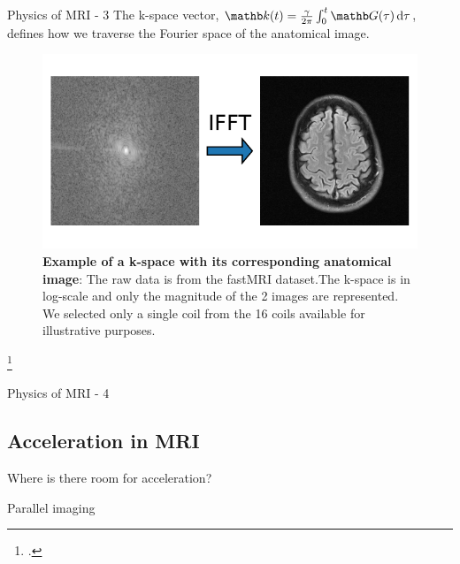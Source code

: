 \documentclass[aspectratio=169,xcolor=dvipsnames]{beamer}
\begin{document}
\begin{frame}{Physics of MRI - 3}
    The k-space vector, $\kb(t) = \frac{\gamma}{2\pi} \int_0^t \Gb(\tau) \dif \tau$, defines how we traverse the Fourier space of the anatomical image.

    \begin{figure}
        \centering
        \includegraphics[height=0.4\textheight]{Figures/intro_figures/kspace_to_image.pdf}
        \caption{\label{fig:example-kspace}\textbf{Example of a k-space with its corresponding anatomical image}: The raw data is from the fastMRI dataset.\footnotemark The k-space is in log-scale and only the magnitude of the 2 images are represented. We selected only a single coil from the 16 coils available for illustrative purposes.}
    \end{figure}
    \footcitetext{Zbontar}
\end{frame}

\begin{frame}{Physics of MRI - 4}
\end{frame}

\subsection{Acceleration in MRI}
\begin{frame}{Where is there room for acceleration?}
\end{frame}

\begin{frame}{Parallel imaging}
\end{frame}
\end{document}

